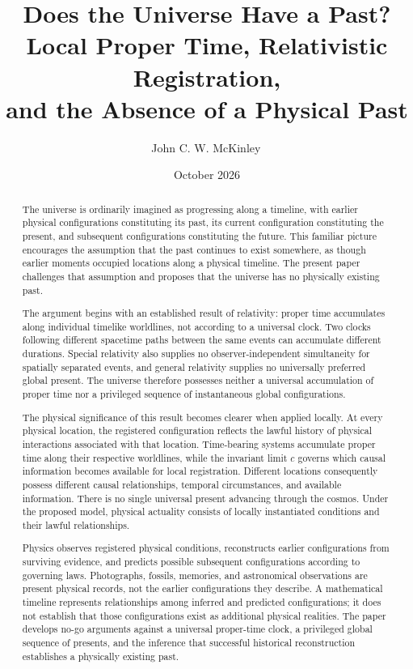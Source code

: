\documentclass[12pt,onecolumn]{article}
\title{
\textbf{Does the Universe Have a Past?}\\[0.5em]
\large Local Proper Time, Relativistic Registration,\\
and the Absence of a Physical Past
}
\author{
John C. W. McKinley\,
\orcidlink{0009-0005-7097-5035}
}
\date{October 2026}
\begin{document}
\maketitle

\begin{abstract}

The universe is ordinarily imagined as progressing along a timeline, with earlier physical configurations constituting its past, its current configuration constituting the present, and subsequent configurations constituting the future. This familiar picture encourages the assumption that the past continues to exist somewhere, as though earlier moments occupied locations along a physical timeline. The present paper challenges that assumption and proposes that the universe has no physically existing past.

The argument begins with an established result of relativity: proper time accumulates along individual timelike worldlines, not according to a universal clock. Two clocks following different spacetime paths between the same events can accumulate different durations. Special relativity also supplies no observer-independent simultaneity for spatially separated events, and general relativity supplies no universally preferred global present. The universe therefore possesses neither a universal accumulation of proper time nor a privileged sequence of instantaneous global configurations.

The physical significance of this result becomes clearer when applied locally. At every physical location, the registered configuration reflects the lawful history of physical interactions associated with that location. Time-bearing systems accumulate proper time along their respective worldlines, while the invariant limit \(c\) governs which causal information becomes available for local registration. Different locations consequently possess different causal relationships, temporal circumstances, and available information. There is no single universal present advancing through the cosmos. Under the proposed model, physical actuality consists of locally instantiated conditions and their lawful relationships.

Physics observes registered physical conditions, reconstructs earlier configurations from surviving evidence, and predicts possible subsequent configurations according to governing laws. Photographs, fossils, memories, and astronomical observations are present physical records, not the earlier configurations they describe. A mathematical timeline represents relationships among inferred and predicted configurations; it does not establish that those configurations exist as additional physical realities. The paper develops no-go arguments against a universal proper-time clock, a privileged global sequence of presents, and the inference that successful historical reconstruction establishes a physically existing past.


\end{abstract}
\end{document}

